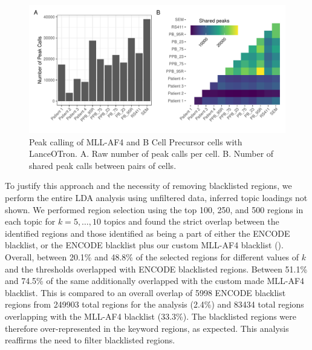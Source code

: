 \begin{figure}
    \centering
    \includegraphics[width=\textwidth]{plot/ch5/mll_redo_shared_peaks.pdf}
    \caption{Peak calling of MLL-AF4 and B Cell Precursor cells with LanceOTron. A. Raw number of peak calls per cell. B. Number of shared peak calls between pairs of cells.}
    \label{fig:mll_peak_calls}
\end{figure}

To justify this approach and the necessity of removing blacklisted regions, we perform the entire LDA analysis using unfiltered data, inferred topic loadings not shown. We performed region selection using the top 100, 250, and 500 regions in each topic for $k=5, \ldots, 10$ topics and found the strict overlap between the identified regions and those identified as being a part of either the ENCODE blacklist, or the ENCODE blacklist plus our custom MLL-AF4 blacklist (). Overall, between 20.1\% and 48.8\% of the selected regions for different values of $k$ and the thresholds overlapped with ENCODE blacklisted regions. Between 51.1\% and 74.5\% of the same additionally overlapped with the custom made MLL-AF4 blacklist. 
This is compared to an overall overlap of 5998 ENCODE blacklist regions from 249903 total regions for the analysis (2.4\%) and 83434 total regions overlapping with the MLL-AF4 blacklist (33.3\%). 
The blacklisted regions were therefore over-represented in the keyword regions, as expected. This analysis reaffirms the need to filter blacklisted regions.

